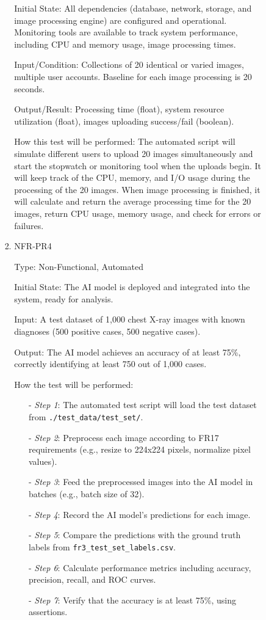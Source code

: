 \documentclass[12pt, titlepage]{article}
\begin{document}
\begin{enumerate}
\begin{enumerate}
\begin{enumerate}
\begin{enumerate}
Initial State: All dependencies (database, network, storage, and image processing engine) are configured and operational. Monitoring tools are available to track system performance, including CPU and memory usage, image processing times.

Input/Condition: Collections of 20 identical or varied images, multiple user accounts. Baseline for each image processing is 20 seconds.

Output/Result: Processing time (float), system resource utilization (float), images uploading success/fail (boolean).

How this test will be performed: The automated script will simulate different users to upload 20 images simultaneously and start the stopwatch or monitoring tool when the uploads begin. It will keep track of the CPU, memory, and I/O usage during the processing of the 20 images. When image processing is finished, it will calculate and return the average processing time for the 20 images, return CPU usage, memory usage, and check for errors or failures.

\item{NFR-PR4\\}\label{NFR-PR4}
\begin{enumerate}

Type: Non-Functional, Automated

Initial State: The AI model is deployed and integrated into the system, ready for analysis.

Input: A test dataset of 1,000 chest X-ray images with known diagnoses (500 positive cases, 500 negative cases).

Output: The AI model achieves an accuracy of at least 75\%, correctly identifying at least 750 out of 1,000 cases.

How the test will be performed:
\begin{itemize}
  \item[-] \textit{Step 1}: The automated test script will load the test dataset from \texttt{./test\_data/test\_set/}.
  \item[-] \textit{Step 2}: Preprocess each image according to FR17 requirements (e.g., resize to 224x224 pixels, normalize pixel values).
  \item[-] \textit{Step 3}: Feed the preprocessed images into the AI model in batches (e.g., batch size of 32).
  \item[-] \textit{Step 4}: Record the AI model's predictions for each image.
  \item[-] \textit{Step 5}: Compare the predictions with the ground truth labels from \texttt{fr3\_test\_set\_labels.csv}.
  \item[-] \textit{Step 6}: Calculate performance metrics including accuracy, precision, recall, and ROC curves.
  \item[-] \textit{Step 7}: Verify that the accuracy is at least 75\%, using assertions.
\end{itemize}


\end{enumerate}
\end{enumerate}
\end{enumerate}
\end{enumerate}
\end{enumerate}
\end{document}
